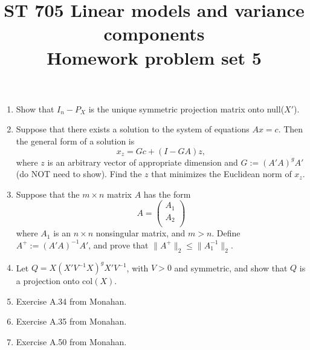 \documentclass[11pt]{article}
\title{ST 705 Linear models and variance components \\ 
        Homework problem set 5}
\begin{document}
\maketitle

\begin{enumerate}

\item Show that $I_{n} - P_{X}$ is the unique symmetric projection matrix onto null($X'$).

\item Suppose that there exists a solution to the system of equations $Ax = c$.  Then the general form of a solution is
\[
x_{z} = Gc + (I - GA)z,
\]
where $z$ is an arbitrary vector of appropriate dimension and $G := (A'A)^{g}A'$ (do NOT need to show).  Find the $z$ that minimizes the Euclidean norm of $x_{z}$.

\item Suppose that the $m\times n$ matrix $A$ has the form 
\[
A = 
\begin{pmatrix}
A_{1} \\
A_{2} \\
\end{pmatrix}
\]
where $A_{1}$ is an $n\times n$ nonsingular matrix, and $m > n$.  Define $A^{+} := (A'A)^{-1}A'$, and prove that $\|A^{+}\|_{2} \le \|A_{1}^{-1}\|_{2}$.

\item Let $Q = X(X'V^{-1}X)^{g}X'V^{-1}$, with $V > 0$ and symmetric, and show that $Q$ is a projection onto col$(X)$.

\item Exercise A.34 from Monahan.

\item Exercise A.35 from Monahan.

\item Exercise A.50 from Monahan.

\end{enumerate}
\end{document}
